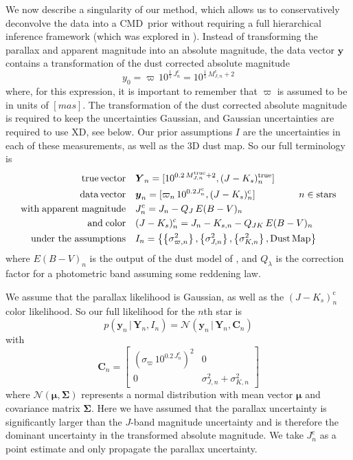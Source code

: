 \documentclass[modern]{aastex61}
\newcommand{\acronym}[1]{{\small{#1}}}
\newcommand{\xd}{\acronym{XD}}
\newcommand{\cmd}{\acronym{CMD}}
\newcommand{\given}{\,|\,}
\newcommand{\true}{\mathrm{true}}
\newcommand{\corr}{\mathrm{c}}
\renewcommand{\vec}[1]{\boldsymbol{{#1}}}
\newcommand{\truth}{\vec{Y}}
\newcommand{\data}{\vec{y}}
\newcommand{\mean}{\vec{\mu}}
\newcommand{\mat}[1]{{\mathbf{{#1}}}}
\newcommand{\covar}{\mat{C}}
\begin{document}
We now describe a singularity of our method, which allows us to conservatively deconvolve the data into a \cmd\ prior without requiring a full hierarchical inference framework (which was explored in \citealt{leistedtHogg2017}).
Instead of transforming the parallax and apparent magnitude into an absolute magnitude, the data vector $\data$ contains a transformation of the dust corrected absolute magnitude
\begin{equation}
y_0 = \varpi\,10^{\frac{1}{5}\,J^{\corr}_n} = 10^{\frac{1}{5}\,M^{\corr}_{J,n} + 2}
\label{eq:transform}
\end{equation}
where, for this expression, it is important to remember that $\varpi$ is assumed to be in units of $[mas]$.
The transformation of the dust corrected absolute magnitude is required to keep the uncertainties Gaussian, and Gaussian uncertainties are required to use \xd, see below.
Our prior assumptions $I$ are the uncertainties in each of these measurements, as well as the 3D dust map. So our full terminology is
\begin{equation}
\begin{aligned}
\mathrm{true \, vector} \quad &\truth_n = [10^{0.2\,M^{\true}_{J,n} + 2}, (J-K_s)^{\true}_n] \\
\mathrm{data \, vector} \quad &\data_n = [\varpi_n\,10^{0.2J^{\corr}_n}, (J-K_s)^{\corr}_n] \;\hspace*{15mm}  n \in \mathrm{stars} \\
\mathrm{with \; apparent \; magnitude} \quad &J^{\corr}_n = J_n - Q_J\,E(B-V)_n \\
\mathrm{and \; color} \quad &(J-K_s)^{\corr}_n = J_n - K_{s,n} - Q_{JK}\,E(B-V)_n \\
\mathrm{under\ the\ assumptions} \quad &I_n = \left\{\left\{\sigma^2_{\varpi, n}\right\}, \left\{\sigma^2_{J,n}\right\}, \left\{\sigma^2_{K,n}\right\}, \mathrm{Dust \, Map}\right\}
\end{aligned}
\label{eq:data}
\end{equation}
where $E(B-V)_n$ is the output of the dust model of \cite{green15}, and $Q_{\lambda}$ is the correction factor for a photometric band assuming some reddening law.

We assume that the parallax likelihood is Gaussian, as well as the $(J-K_s)^{\corr}_n$ color likelihood. So our full likelihood for the $n$th star is
\begin{equation}
p(\data_n \given \truth_n, I_n) = \mathcal{N}(\data_n \given \truth_n, \covar_n)
\end{equation}
with \\
\[
\covar_n = \begin{bmatrix}
\left(\sigma_{\varpi}\,10^{0.2\,J_n^{\corr}}\right)^2 & 0 \\
0 & \sigma_{J,n}^2 + \sigma_{K,n}^2
\end{bmatrix}
\]
where $\mathcal{N}(\mean, \mat{\Sigma})$ represents a normal distribution with
mean vector $\mean$ and covariance matrix $\mat{\Sigma}$.
Here we have assumed that the parallax uncertainty is significantly larger than the $J$-band magnitude uncertainty and is therefore the dominant uncertainty in the transformed absolute magnitude. We take $J_n^{\corr}$ as a point estimate and only propagate the parallax uncertainty.
\end{document}
